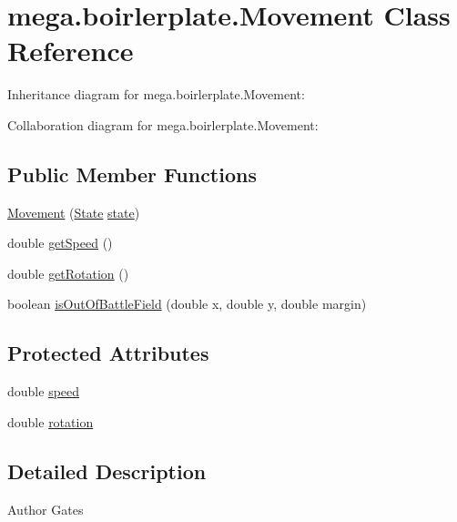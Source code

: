 \hypertarget{classmega_1_1boirlerplate_1_1_movement}{}\section{mega.\+boirlerplate.\+Movement Class Reference}
\label{classmega_1_1boirlerplate_1_1_movement}


Inheritance diagram for mega.\+boirlerplate.\+Movement\+:


Collaboration diagram for mega.\+boirlerplate.\+Movement\+:
\subsection*{Public Member Functions}
\begin{DoxyCompactItemize}
\item 
\hyperlink{classmega_1_1boirlerplate_1_1_movement_a6ab4e12baf6f275b284f0b90dfa300e1}{Movement} (\hyperlink{classmega_1_1boirlerplate_1_1_state}{State} \hyperlink{classmega_1_1boirlerplate_1_1_component_a87b0d70f323b5fee60a200e07c9c20fd}{state})
\item 
double \hyperlink{classmega_1_1boirlerplate_1_1_movement_a17278ea51b6cd25cb60f1a755fa2fdfe}{get\+Speed} ()
\item 
double \hyperlink{classmega_1_1boirlerplate_1_1_movement_a254357a8df2314189198217027d3d25c}{get\+Rotation} ()
\item 
boolean \hyperlink{classmega_1_1boirlerplate_1_1_movement_a2b5fbe62b5f09644750da41784622351}{is\+Out\+Of\+Battle\+Field} (double x, double y, double margin)
\end{DoxyCompactItemize}
\subsection*{Protected Attributes}
\begin{DoxyCompactItemize}
\item 
double \hyperlink{classmega_1_1boirlerplate_1_1_movement_ad69a2251b52e302bb9c17607903b3e7d}{speed}
\item 
double \hyperlink{classmega_1_1boirlerplate_1_1_movement_af8a9e7e7a7636121f3cfc9b01b8409fd}{rotation}
\end{DoxyCompactItemize}


\subsection{Detailed Description}
\begin{DoxyAuthor}{Author}
Gates 
\end{DoxyAuthor}



